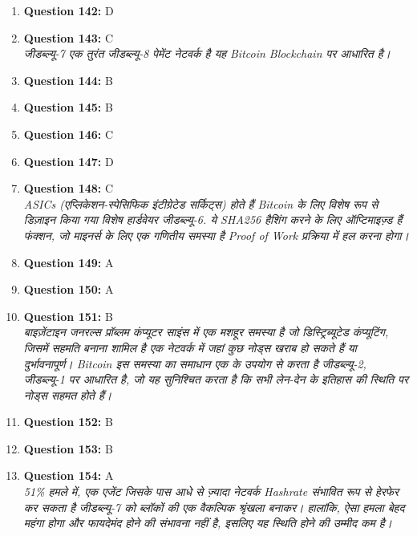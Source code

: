 \documentclass[12pt,a4paper]{article}
\begin{document}
\begin{enumerate}
\item \textbf{Question 142:} D

\item \textbf{Question 143:} C
\\ \textit{जीडब्ल्यू-7 एक तुरंत जीडब्ल्यू-8 पेमेंट नेटवर्क है यह Bitcoin Blockchain पर आधारित है।}

\item \textbf{Question 144:} B

\item \textbf{Question 145:} B

\item \textbf{Question 146:} C

\item \textbf{Question 147:} D

\item \textbf{Question 148:} C
\\ \textit{ASICs (एप्लिकेशन-स्पेसिफिक इंटीग्रेटेड सर्किट्स) होते हैं Bitcoin के लिए विशेष रूप से डिज़ाइन किया गया विशेष हार्डवेयर जीडब्ल्यू-6. ये SHA256 हैशिंग करने के लिए ऑप्टिमाइज़्ड हैं फंक्शन, जो माइनर्स के लिए एक गणितीय समस्या है Proof of Work प्रक्रिया में हल करना होगा।}

\item \textbf{Question 149:} A

\item \textbf{Question 150:} A

\item \textbf{Question 151:} B
\\ \textit{बाइज़ेंटाइन जनरल्स प्रॉब्लम कंप्यूटर साइंस में एक मशहूर समस्या है जो डिस्ट्रिब्यूटेड कंप्यूटिंग, जिसमें सहमति बनाना शामिल है एक नेटवर्क में जहां कुछ नोड्स खराब हो सकते हैं या दुर्भावनापूर्ण। Bitcoin इस समस्या का समाधान एक के उपयोग से करता है जीडब्ल्यू-2, जीडब्ल्यू-1 पर आधारित है, जो यह सुनिश्चित करता है कि सभी लेन-देन के इतिहास की स्थिति पर नोड्स सहमत होते हैं।}

\item \textbf{Question 152:} B

\item \textbf{Question 153:} B

\item \textbf{Question 154:} A
\\ \textit{51\% हमले में, एक एजेंट जिसके पास आधे से ज़्यादा नेटवर्क Hashrate संभावित रूप से हेरफेर कर सकता है जीडब्ल्यू-7 को ब्लॉकों की एक वैकल्पिक श्रृंखला बनाकर। हालांकि, ऐसा हमला बेहद महंगा होगा और फायदेमंद होने की संभावना नहीं है, इसलिए यह स्थिति होने की उम्मीद कम है।}


\end{enumerate}
\end{document}
